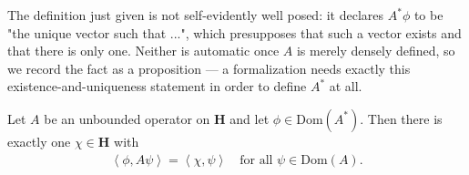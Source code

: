 The definition just given is not self-evidently well posed: it declares $A^*\phi$ to be "the unique vector such that ...", which presupposes that such a vector exists and that there is only one. Neither is automatic once $A$ is merely densely defined, so we record the fact as a proposition — a formalization needs exactly this existence-and-uniqueness statement in order to define $A^*$ at all.

\begin{proposition}
    \label{prpstn:adjoint-well-defined}
    \leanok
    Let $A$ be an unbounded operator on $\mathbf{H}$ and let $\phi \in \text{Dom}(A^*)$. Then there is exactly one $\chi \in \mathbf{H}$ with
    \begin{align}
        \left< \phi, A\psi \right> = \left< \chi, \psi \right> \quad \text{for all } \psi \in \text{Dom}(A).
    \end{align}
\end{proposition}
